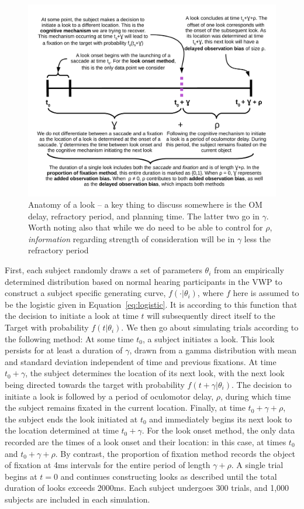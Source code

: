 \documentclass{article}
\begin{document}
\begin{figure}[H]
\centering
\includegraphics[width=\textwidth]{anatomy_of_look.pdf}
\caption{Anatomy of a look -- a key thing to discuss somewhere is the OM delay, refractory period, and planning time. The latter two go in $\gamma$. Worth noting also that while we do need to be able to control for $\rho$, \textit{information} regarding strength of consideration will be in $\gamma$ less the refractory period}
\label{fig:anatomy_of_look}
\end{figure}


First, each subject randomly draws a set of parameters $\theta_i$ from an empirically determined distribution based on normal hearing participants in the VWP \cite{FarrisTrimble2014} to construct a subject specific generating curve, $f(\cdot | \theta_i)$, where $f$ here is assumed to be the logistic given in Equation~\ref{eq:logistic}.   It is according to this function that the decision to initiate a look at time $t$ will subsequently direct itself to the Target with probability $f(t|\theta_i)$. We then go about simulating trials according to the following method: At some time $t_0$, a subject initiates a look. This look persists for at least a duration of $\gamma$, drawn from a gamma distribution with mean and standard deviation independent of time and previous fixations. At time $t_0+\gamma$, the subject determines the location of its next look, with the next look being directed towards the target with probability $f(t+\gamma | \theta_i)$. The decision to initiate a look is followed by a period of oculomotor delay, $\rho$, during which time the subject remains fixated in the current location. Finally, at time $t_0 + \gamma + \rho$, the subject ends the look initiated at $t_0$ and immediately begins its next look to the location determined at time $t_0 + \gamma$. For the look onset method, the only data recorded are the times of a look onset and their location: in this case, at times $t_0$ and $t_0 + \gamma + \rho$. By contrast, the proportion of fixation method records the object of fixation at 4ms intervals for the entire period of length $\gamma + \rho$. A single trial begins at $t = 0$ and continues constructing looks as described until the total duration of looks exceeds 2000ms. Each subject undergoes 300 trials, and 1,000 subjects are included in each simulation.
\end{document}
